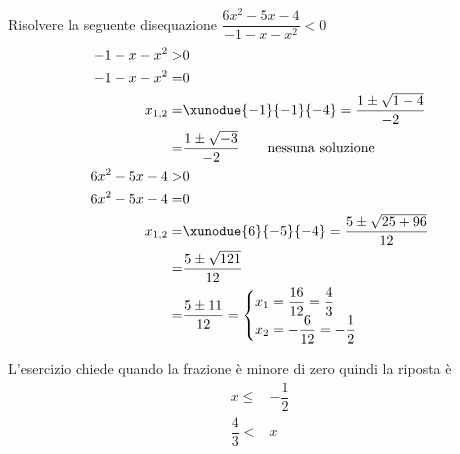 	Risolvere la seguente disequazione $\dfrac{6x^2-5x-4}{-1-x-x^2}< 0$
\begin{align*}
-1-x-x^2>&0\\
-1-x-x^2=&0\\
x_{1,2}=&\xunodue{-1}{-1}{-4}=\dfrac{1\pm\sqrt{1-4}}{-2}\\
=&\dfrac{1\pm\sqrt{-3}}{-2}
\qquad\text{nessuna soluzione}\\
6x^2-5x-4>&0\\
6x^2-5x-4=&0\\
x_{1,2}=&\xunodue{6}{-5}{-4}=\dfrac{5\pm\sqrt{25+96}}{12}\\
=&\dfrac{5\pm\sqrt{121}}{12}\\
=&\dfrac{5\pm 11}{12}=\begin{cases}
x_1=\dfrac{16}{12}=\dfrac{4}{3}\\
x_2=-\dfrac{6}{12}=-\dfrac{1}{2}
\end{cases}\\
\end{align*}
\begin{center}
	
\end{center}
L'esercizio chiede quando la frazione è minore di zero quindi la riposta è
\begin{align*}
x\leq& -\dfrac{1}{2}\\  \dfrac{4}{3}<&x\\
\end{align*}
